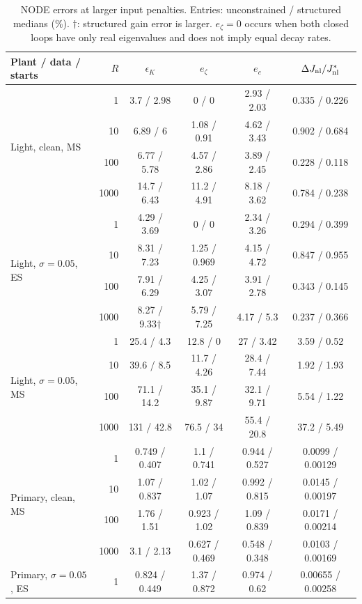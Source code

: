 \begin{table}[t]
\centering
\small
\setlength{\tabcolsep}{5pt}
\caption{NODE errors at larger input penalties. Entries: unconstrained / structured medians (\%). $\dagger$: structured gain error is larger. $e_\zeta=0$ occurs when both closed loops have only real eigenvalues and does not imply equal decay rates.}
\label{tab:control-weights}
\begin{tabular}{lrcccc}
\toprule
Plant / data / starts & $R$ & $\epsilon_K$ & $e_\zeta$ & $e_c$ & $\Delta J_{\rm nl}/J^*_{\rm nl}$ \\
\midrule
\multirow{4}{*}{Light, clean, MS} & 1 & 3.7 / 2.98 & 0 / 0 & 2.93 / 2.03 & 0.335 / 0.226 \\
 & 10 & 6.89 / 6 & 1.08 / 0.91 & 4.62 / 3.43 & 0.902 / 0.684 \\
 & 100 & 6.77 / 5.78 & 4.57 / 2.86 & 3.89 / 2.45 & 0.228 / 0.118 \\
 & 1000 & 14.7 / 6.43 & 11.2 / 4.91 & 8.18 / 3.62 & 0.784 / 0.238 \\
\midrule\multirow{4}{*}{Light, $\sigma=0.05$, ES} & 1 & 4.29 / 3.69 & 0 / 0 & 2.34 / 3.26 & 0.294 / 0.399 \\
 & 10 & 8.31 / 7.23 & 1.25 / 0.969 & 4.15 / 4.72 & 0.847 / 0.955 \\
 & 100 & 7.91 / 6.29 & 4.25 / 3.07 & 3.91 / 2.78 & 0.343 / 0.145 \\
 & 1000 & 8.27 / 9.33$\dagger$ & 5.79 / 7.25 & 4.17 / 5.3 & 0.237 / 0.366 \\
\midrule\multirow{4}{*}{Light, $\sigma=0.05$, MS} & 1 & 25.4 / 4.3 & 12.8 / 0 & 27 / 3.42 & 3.59 / 0.52 \\
 & 10 & 39.6 / 8.5 & 11.7 / 4.26 & 28.4 / 7.44 & 1.92 / 1.93 \\
 & 100 & 71.1 / 14.2 & 35.1 / 9.87 & 32.1 / 9.71 & 5.54 / 1.22 \\
 & 1000 & 131 / 42.8 & 76.5 / 34 & 55.4 / 20.8 & 37.2 / 5.49 \\
\midrule\multirow{4}{*}{Primary, clean, MS} & 1 & 0.749 / 0.407 & 1.1 / 0.741 & 0.944 / 0.527 & 0.0099 / 0.00129 \\
 & 10 & 1.07 / 0.837 & 1.02 / 1.07 & 0.992 / 0.815 & 0.0145 / 0.00197 \\
 & 100 & 1.76 / 1.51 & 0.923 / 1.02 & 1.09 / 0.839 & 0.0171 / 0.00214 \\
 & 1000 & 3.1 / 2.13 & 0.627 / 0.469 & 0.548 / 0.348 & 0.0103 / 0.00169 \\
\midrule\multirow{4}{*}{Primary, $\sigma=0.05$, ES} & 1 & 0.824 / 0.449 & 1.37 / 0.872 & 0.974 / 0.62 & 0.00655 / 0.00258 \\

\end{tabular}
\end{table}
